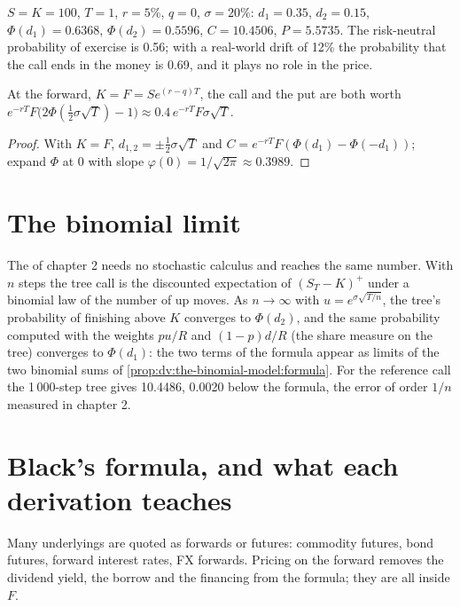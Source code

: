 \begin{example}\label{ex:dv:black-scholes-three-ways:ref}
$S=K=100$, $T=1$, $r=5\%$, $q=0$, $\sigma=20\%$: $d_1=0.35$, $d_2=0.15$,
$\Phi(d_1)=0.6368$, $\Phi(d_2)=0.5596$, $C=10.4506$, $P=5.5735$. The risk-neutral
probability of exercise is 0.56; with a real-world drift of 12\% the
probability that the call ends in the money is 0.69, and it plays no role in the
price.
\end{example}

\begin{proposition}\label{prop:dv:black-scholes-three-ways:atm}
At the forward, $K=F=Se^{(r-q)T}$, the call and the put are both worth
$e^{-rT}F\bigl(2\Phi(\tfrac12\sigma\sqrt T)-1\bigr)\approx0.4\,e^{-rT}F\sigma\sqrt T$.
\end{proposition}
\begin{proof}
With $K=F$, $d_{1,2}=\pm\tfrac12\sigma\sqrt T$ and $C=e^{-rT}F(\Phi(d_1)-\Phi(-d_1))$;
expand $\Phi$ at 0 with slope $\varphi(0)=1/\sqrt{2\pi}\approx0.3989$.
\end{proof}

\section{The binomial limit}

The  of chapter 2 needs no stochastic calculus and
reaches the same number. With $n$ steps the tree call is the discounted
expectation of $(S_T-K)^+$ under a binomial law of the number of up moves. As
$n\to\infty$ with $u=e^{\sigma\sqrt{T/n}}$, the tree's probability of finishing
above $K$ converges to $\Phi(d_2)$, and the same probability computed with the
weights $pu/R$ and $(1-p)d/R$ (the share measure on the tree) converges to
$\Phi(d_1)$: the two terms of the formula appear as limits of the two binomial
sums of \cref{prop:dv:the-binomial-model:formula}. For the reference call the
1\,000-step tree gives 10.4486, 0.0020 below the formula, the error of order
$1/n$ measured in chapter 2.

\section{Black's formula, and what each derivation teaches}

Many underlyings are quoted as forwards or futures: commodity futures, bond
futures, forward interest rates, FX forwards. Pricing on the forward removes the
dividend yield, the borrow and the financing from the formula; they are all
inside $F$.

